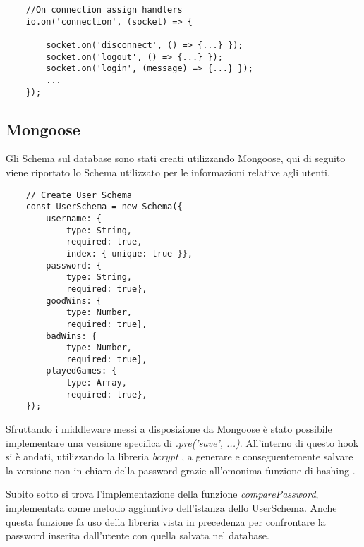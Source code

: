 \begin{verbatim}
    //On connection assign handlers
    io.on('connection', (socket) => {

        socket.on('disconnect', () => {...} });
        socket.on('logout', () => {...} });
        socket.on('login', (message) => {...} });
        ...
    });

\end{verbatim}

\subsection{Mongoose}
Gli Schema sul database sono stati creati utilizzando Mongoose, qui di seguito viene riportato lo Schema utilizzato per le informazioni relative agli utenti.
\begin{verbatim}
    // Create User Schema
    const UserSchema = new Schema({
        username: {
            type: String,
            required: true,
            index: { unique: true }},
        password: {
            type: String,
            required: true},
        goodWins: {
            type: Number,
            required: true},
        badWins: {
            type: Number,
            required: true},
        playedGames: {
            type: Array,
            required: true},
    });
\end{verbatim}

Sfruttando i middleware messi a disposizione da Mongoose è stato possibile implementare una versione specifica di \emph{.pre('save', ...)}. All'interno di questo hook si è andati, utilizzando la libreria \emph{bcrypt} \cite{npmjsBcrypt}, a generare e conseguentemente salvare la versione non in chiaro della password grazie all'omonima funzione di hashing \cite{bcryptWikipedia}. 

Subito sotto si trova l'implementazione della funzione \emph{comparePassword}, implementata come metodo aggiuntivo dell'istanza dello UserSchema. Anche questa funzione fa uso della libreria vista in precedenza per confrontare la password inserita dall'utente con quella salvata nel database. 

